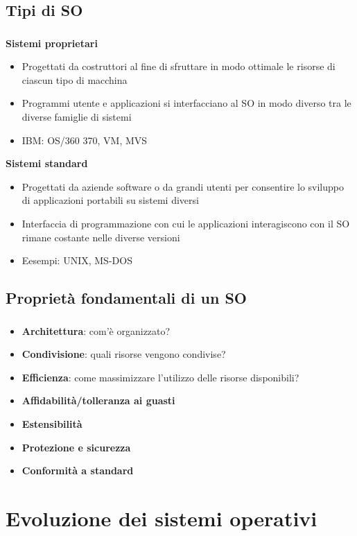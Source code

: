 \documentclass{beamer}
\newenvironment{mainframe}{
	\begin{frame}
		\frametitle{\insertsubsection}
		\framesubtitle{\insertsection}
	}{
	\end{frame}
}
\begin{document}
\subsection{Tipi di SO}
\begin{mainframe}
	\textbf{Sistemi proprietari}
	\begin{itemize}
		\item Progettati da costruttori al fine di sfruttare in modo ottimale le risorse di ciascun tipo di macchina
		\item Programmi utente e applicazioni si interfacciano al SO in modo diverso tra le diverse famiglie di sistemi
		\item IBM: OS/360 370, VM, MVS
	\end{itemize}
	\textbf{Sistemi standard}
	\begin{itemize}
		\item Progettati da aziende software o da grandi utenti per consentire lo sviluppo di applicazioni portabili su sistemi diversi
		\item Interfaccia di programmazione con cui le applicazioni interagiscono con il SO rimane costante nelle diverse versioni
		\item Eesempi: UNIX, MS-DOS
	\end{itemize}
\end{mainframe}
\subsection{Proprietà fondamentali di un SO}
\begin{mainframe}
	\begin{itemize}
		\item \textbf{Architettura}: com'è organizzato?
		\item \textbf{Condivisione}: quali risorse vengono condivise?
		\item \textbf{Efficienza}: come massimizzare l'utilizzo delle risorse disponibili?
		\item \textbf{Affidabilità/tolleranza ai guasti}
		\item \textbf{Estensibilità}
		\item \textbf{Protezione e sicurezza}
		\item \textbf{Conformità a standard}
	\end{itemize}
\end{mainframe}
\section{Evoluzione dei sistemi operativi}
\end{document}
